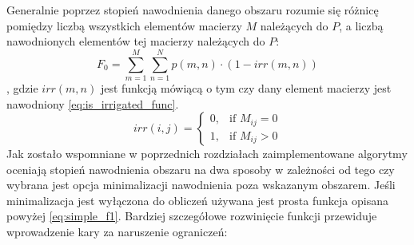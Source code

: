 \documentclass[twoside]{iisthesis}
\begin{document}
Generalnie poprzez stopień nawodnienia danego obszaru rozumie się różnicę pomiędzy liczbą wszystkich elementów macierzy $M$ należących do $P$, a liczbą nawodnionych elementów tej macierzy należących do $P$:
\begin{equation}\label{eq:simple_f1}
	F_{0} = \sum_{m=1}^{M}\sum_{n=1}^{N} p(m,n) \cdot (1 - irr(m,n))
\end{equation}
, gdzie $irr(m,n)$ jest funkcją mówiącą o tym czy dany element macierzy jest nawodniony \eqref{eq:is_irrigated_func}.
\begin{equation}\label{eq:is_irrigated_func}
	irr(i,j) = \begin{cases}
				0,& \text{if } M_{ij} = 0 \\
				1,& \text{if } M_{ij} > 0
			   \end{cases}
\end{equation}
Jak zostało wspomniane w poprzednich rozdziałach zaimplementowane algorytmy oceniają stopień nawodnienia obszaru na dwa sposoby w zależności od tego czy wybrana jest opcja minimalizacji nawodnienia poza wskazanym obszarem. Jeśli minimalizacja jest wyłączona do obliczeń używana jest prosta funkcja opisana powyżej \eqref{eq:simple_f1}. Bardziej szczegółowe rozwinięcie funkcji przewiduje wprowadzenie kary za naruszenie ograniczeń:
\end{document}

